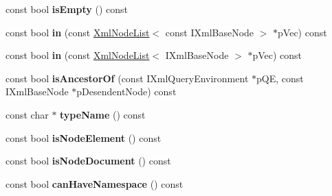 \begin{DoxyCompactItemize}
\item 
\hypertarget{classgeneral__server_1_1XmlBaseNode_abb459ec32fe129cfee48230e74ccce55}{const bool {\bfseries is\-Empty} () const }\label{classgeneral__server_1_1XmlBaseNode_abb459ec32fe129cfee48230e74ccce55}

\item 
\hypertarget{classgeneral__server_1_1XmlBaseNode_abcdf929aa40ef69461c23c5ef267158f}{const bool {\bfseries in} (const \hyperlink{classgeneral__server_1_1XmlNodeList}{\-Xml\-Node\-List}$<$ const \-I\-Xml\-Base\-Node $>$ $\ast$p\-Vec) const }\label{classgeneral__server_1_1XmlBaseNode_abcdf929aa40ef69461c23c5ef267158f}

\item 
\hypertarget{classgeneral__server_1_1XmlBaseNode_af584e0b0e84b7da8218bfcbaad8af785}{const bool {\bfseries in} (const \hyperlink{classgeneral__server_1_1XmlNodeList}{\-Xml\-Node\-List}$<$ \-I\-Xml\-Base\-Node $>$ $\ast$p\-Vec) const }\label{classgeneral__server_1_1XmlBaseNode_af584e0b0e84b7da8218bfcbaad8af785}

\item 
\hypertarget{classgeneral__server_1_1XmlBaseNode_af3f914bfebb1a269a692e7e46ee36548}{const bool {\bfseries is\-Ancestor\-Of} (const \-I\-Xml\-Query\-Environment $\ast$p\-Q\-E, const \-I\-Xml\-Base\-Node $\ast$p\-Desendent\-Node) const }\label{classgeneral__server_1_1XmlBaseNode_af3f914bfebb1a269a692e7e46ee36548}

\item 
\hypertarget{classgeneral__server_1_1XmlBaseNode_a2e0ec569502338274c6b0471cc929311}{const char $\ast$ {\bfseries type\-Name} () const }\label{classgeneral__server_1_1XmlBaseNode_a2e0ec569502338274c6b0471cc929311}

\item 
\hypertarget{classgeneral__server_1_1XmlBaseNode_a9eec6a95d90600f873815f794792a1bb}{const bool {\bfseries is\-Node\-Element} () const }\label{classgeneral__server_1_1XmlBaseNode_a9eec6a95d90600f873815f794792a1bb}

\item 
\hypertarget{classgeneral__server_1_1XmlBaseNode_a7b12b8f56c2427bae08f74c88976a1da}{const bool {\bfseries is\-Node\-Document} () const }\label{classgeneral__server_1_1XmlBaseNode_a7b12b8f56c2427bae08f74c88976a1da}

\item 
\hypertarget{classgeneral__server_1_1XmlBaseNode_ac7ec221e72e2d65a8461b32947e5abdf}{const bool {\bfseries can\-Have\-Namespace} () const }\label{classgeneral__server_1_1XmlBaseNode_ac7ec221e72e2d65a8461b32947e5abdf}


\end{DoxyCompactItemize}
